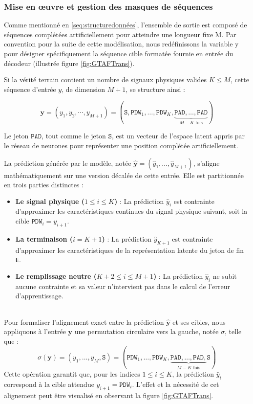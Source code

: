 \subsubsection{Mise en œuvre et gestion des masques de séquences}
Comme mentionné en \ref{seq:structuredonnées}, l'ensemble de sortie est composé de séquences complétées artificiellement pour atteindre une longueur fixe M. Par convention pour la suite de cette modélisation, nous redéfinissons la variable y pour désigner spécifiquement la séquence cible formatée fournie en entrée du décodeur (illustrée figure \ref{fig:GTAFTrans}).

Si la vérité terrain contient un nombre de signaux physiques valides $K \le M$, cette séquence d'entrée $y$, de dimension $M+1$, se structure ainsi :

$$\mathbf{y} = (y_1, y_2, \cdots, y_{M+1}) = (\texttt{S}, \texttt{PDW}_1, \dots, \texttt{PDW}_K, \underbrace{\texttt{PAD}, \dots, \texttt{PAD}}_{M-K \text{ fois}})$$

Le jeton $\texttt{PAD}$, tout comme le jeton $\texttt{S}$, est un vecteur de l'espace latent appris par le réseau de neurones pour représenter une position complétée artificiellement.

La prédiction générée par le modèle, notée $\hat{\mathbf{y}} = (\hat{y}_1, \dots, \hat{y}_{M+1})$, s'aligne mathématiquement sur une version décalée de cette entrée. Elle est partitionnée en trois parties distinctes :

\begin{itemize}
\item \textbf{Le signal physique ($1 \leq i \leq K$)} : La prédiction $\hat{y}_i$ est contrainte d'approximer les caractéristiques continues du signal physique suivant, soit la cible $\texttt{PDW}_i = y_{i+1}$.
\item \textbf{La terminaison ($i = K+1$)} : La prédiction $\hat{y}_{K+1}$ est contrainte d'approximer les caractéristiques de la représentation latente du jeton de fin \texttt{E}.
\item \textbf{Le remplissage neutre ($K+2 \leq i \leq M+1$)} : La prédiction $\hat{y}_i$ ne subit aucune contrainte et sa valeur n'intervient pas dans le calcul de l'erreur d'apprentissage.
\end{itemize}
\; \\

Pour formaliser l'alignement exact entre la prédiction $\hat{\mathbf{y}}$ et ses cibles, nous appliquons à l'entrée $\mathbf{y}$ une permutation circulaire vers la gauche, notée $\sigma$, telle que :
$$\sigma(\mathbf{y}) = (y_1, \dots, y_M, \texttt{S}) = (\texttt{PDW}_1, \dots, \texttt{PDW}_K, \underbrace{\texttt{PAD}, \dots, \texttt{PAD},}_{M-K \text{ fois}} \texttt{S})$$
Cette opération garantit que, pour les indices $1 \leq i \leq K$, la prédiction $\hat{y}_i$ correspond à la cible attendue $y_{i+1} = \texttt{PDW}_i$. L'effet et la nécessité de cet alignement peut être visualisé en observant la figure \ref{fig:GTAFTrans}.\\

